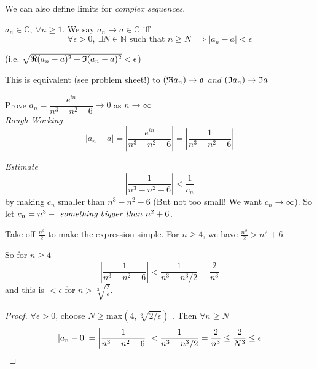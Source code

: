 \documentclass[10pt,twoside]{scrartcl}
\begin{document}
We can
 also define limits for \emph{complex sequences}.\\

\begin{definition}
$a_n \in \mathbb{C},~\forall n \geq 1$. We say $a_n \to a \in \mathbb{C}$ iff
\[\forall \epsilon >0,~\exists N \in \mathbb{N} \text{ such that } n \geq N \implies |a_n - a| < \epsilon\]	

(i.e. $\sqrt{\Re(a_n-a)^2 + \frak{I}(a_n-a)^2} < \epsilon$) 

This is equivalent (see problem sheet!) to $(\frak{R}a_n) \to \frak{a}$ \emph{and} $(\frak{I}a_n) \to \frak{I}a$
\end{definition}\vspace*{10pt}

\begin{example}
Prove $a_n = \dfrac{e^{in}}{n^3-n^2-6} \to 0$ as $n \to \infty$\\

\emph{Rough Working} 
\[|a_n - a| = \left|\dfrac{e^{in}}{n^3-n^2-6} \right| = \left|\frac{1}{n^3-n^2-6}\right|\]

\emph{Estimate} \[\left|\dfrac{1}{n^3-n^2-6}\right| < \dfrac{1}{c_n}\] by making $c_n$ smaller than $n^3 - n^2 - 6$ (But not too small! We want $c_n \to \infty$). So let $c_n = n^3 - \text{\emph{ something bigger than} } n^2 + 6$.

Take off $\frac{n^3}{2}$ to make the expression simple. For $n \geq 4$, we have $\frac{n^3}{2} > n^2 + 6$. 

So for $n \geq 4$
\[\left|\frac{1}{n^3-n^2-6}\right| < \frac{1}{n^3- n^3/2} = \frac{2}{n^3} \]
and this is $< \epsilon$ for $n > \sqrt[3]{\frac{2}{\epsilon}}$.\\

\begin{proof}
$\forall \epsilon > 0$, choose $N \geq \mathrm{max}(4,\sqrt[3]{2/\epsilon})$	. Then $\forall n \geq N$
\[|a_n - 0| = \left| \frac{1}{n^3-n^2 - 6}\right| < \frac{1}{n^3- n^3/2} = \frac{2}{n^3} \leq \frac{2}{N^3} \leq \epsilon \qedhere \]
\end{proof}
\end{example}\vspace*{10pt}
\end{document}
